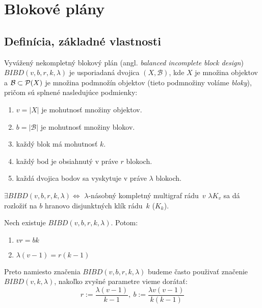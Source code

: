 \chapter{Blokové plány}

\section{Definícia, základné vlastnosti}

\begin{definition}

Vyvážený nekompletný blokový plán (angl. \emph{balanced incomplete block design}) $BIBD(v, b, r, k, \lambda)$ 
je usporiadaná dvojica $(X, \mathcal{B})$, kde $X$ je množina objektov a $\mathcal{B} \subset \mathcal{P}(X)$ je 
množina podmnožín objektov (tieto podmnožiny voláme \emph{bloky}), pričom sú splnené nasledujúce podmienky:

\begin{enumerate}
    \item $v = |X|$ je mohutnosť množiny objektov.
    \item $b = |\mathcal{B}|$ je mohutnosť množiny blokov.
    \item každý blok má mohutnosť $k$.
    \item každý bod je obsiahnutý v práve $r$ blokoch.
    \item každá dvojica bodov sa vyskytuje v práve $\lambda$ blokoch. 
\end{enumerate}
\end{definition}

\begin{theorem}
$\exists BIBD(v, b, r, k, \lambda) \Longleftrightarrow $ $\lambda$-násobný kompletný multigraf rádu~$v$ $\lambda K_v$
sa dá rozložiť na $b$ hranovo disjunktných klík rádu~$k$ ($K_k$).
\end{theorem}

\begin{theorem}

Nech existuje $BIBD(v, b, r, k, \lambda)$. Potom:
\begin{enumerate}
    \item $vr = bk$
    \item $\lambda (v-1) = r (k-1)$
\end{enumerate}
\end{theorem}

\begin{corollary}
Preto namiesto značenia $BIBD(v, b, r, k, \lambda)$ budeme často
použivať značenie $BIBD(v, k, \lambda)$, nakoľko 
zvyšné parametre vieme dorátať: 
$$r := \dfrac{\lambda (v-1)}{k-1},~ b := \dfrac{\lambda v (v-1)}{k (k-1)}$$
\end{corollary}


